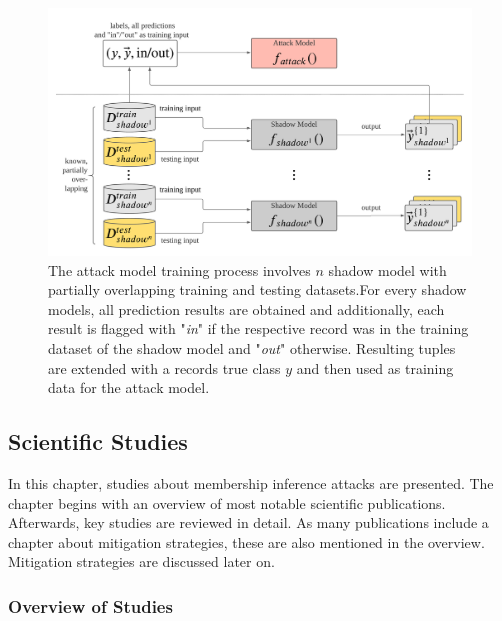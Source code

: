 \documentclass[runningheads]{llncs}
\begin{document}
\begin{figure}[ht]
    \centering
    \includegraphics[scale=0.093]{figures/mia-attack-model-training.png}
    \caption{The attack model training process involves $n$ shadow model with partially overlapping training and testing datasets.For every shadow models, all prediction results are obtained and additionally, each result is flagged with "\textit{in}" if the respective record was in the training dataset of the shadow model and "\textit{out}" otherwise. Resulting tuples are extended with a records true class $y$ and then used as training data for the attack model.}
    \label{fig:attack-training}
\end{figure}

\subsection{Scientific Studies}

In this chapter, studies about membership inference attacks are presented. The chapter begins with an overview of most notable scientific publications. Afterwards, key studies are reviewed in detail. As many publications include a chapter about mitigation strategies, these are also mentioned in the overview. Mitigation strategies are discussed later on.

\subsubsection{Overview of Studies}
\end{document}
